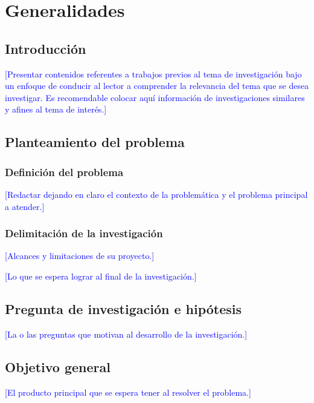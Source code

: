 \chapter{Generalidades}\label{cap1:generalidades}

\section{Introducción}

\textcolor{blue}{[Presentar contenidos referentes a trabajos previos al tema de 
investigación bajo  un enfoque de conducir al lector a comprender la relevancia 
del tema que se desea investigar. Es recomendable colocar aquí información de 
investigaciones similares y afines al tema de interés.]
}

\section{Planteamiento del problema}

\subsection{Definición del problema}

\textcolor{blue}{[Redactar dejando en claro el contexto de la problemática y 
el problema principal a atender.]}

\subsection{Delimitación de la investigación}

\textcolor{blue}{[Alcances y limitaciones de su proyecto.]}\bigskip

\textcolor{blue}{
[Lo que se espera lograr al final de la investigación.]
}

\section{Pregunta de investigación e hipótesis}

\textcolor{blue}{
[La o las preguntas que motivan al desarrollo de la investigación.]
}

\section{Objetivo general}

\textcolor{blue}{
[El producto principal que se espera tener al resolver el problema.]
}

